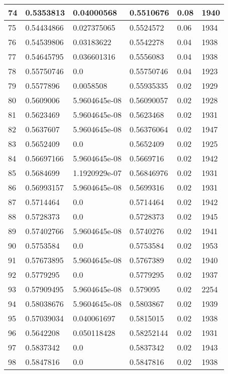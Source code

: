 \begin{longtable}{|l|l|l|l|l|l|}
74 & 0.5353813 & 0.04000568 & 0.5510676 & 0.08 & 1940 \\ \hline 
75 & 0.54434866 & 0.027375065 & 0.5524572 & 0.06 & 1934 \\ \hline 
76 & 0.54539806 & 0.03183622 & 0.5542278 & 0.04 & 1938 \\ \hline 
77 & 0.54645795 & 0.036601316 & 0.5556083 & 0.04 & 1938 \\ \hline 
78 & 0.55750746 & 0.0 & 0.55750746 & 0.04 & 1923 \\ \hline 
79 & 0.5577896 & 0.0058508 & 0.55935335 & 0.02 & 1929 \\ \hline 
80 & 0.5609006 & 5.9604645e-08 & 0.56090057 & 0.02 & 1928 \\ \hline 
81 & 0.5623469 & 5.9604645e-08 & 0.5623468 & 0.02 & 1931 \\ \hline 
82 & 0.5637607 & 5.9604645e-08 & 0.56376064 & 0.02 & 1947 \\ \hline 
83 & 0.5652409 & 0.0 & 0.5652409 & 0.02 & 1925 \\ \hline 
84 & 0.56697166 & 5.9604645e-08 & 0.5669716 & 0.02 & 1942 \\ \hline 
85 & 0.5684699 & 1.1920929e-07 & 0.56846976 & 0.02 & 1931 \\ \hline 
86 & 0.56993157 & 5.9604645e-08 & 0.5699316 & 0.02 & 1931 \\ \hline 
87 & 0.5714464 & 0.0 & 0.5714464 & 0.02 & 1942 \\ \hline 
88 & 0.5728373 & 0.0 & 0.5728373 & 0.02 & 1945 \\ \hline 
89 & 0.57402766 & 5.9604645e-08 & 0.5740276 & 0.02 & 1941 \\ \hline 
90 & 0.5753584 & 0.0 & 0.5753584 & 0.02 & 1953 \\ \hline 
91 & 0.57673895 & 5.9604645e-08 & 0.5767389 & 0.02 & 1940 \\ \hline 
92 & 0.5779295 & 0.0 & 0.5779295 & 0.02 & 1937 \\ \hline 
93 & 0.57909495 & 5.9604645e-08 & 0.579095 & 0.02 & 2254 \\ \hline 
94 & 0.58038676 & 5.9604645e-08 & 0.5803867 & 0.02 & 1939 \\ \hline 
95 & 0.57039034 & 0.040061697 & 0.5815015 & 0.02 & 1938 \\ \hline 
96 & 0.5642208 & 0.050118428 & 0.58252144 & 0.02 & 1931 \\ \hline 
97 & 0.5837342 & 0.0 & 0.5837342 & 0.02 & 1943 \\ \hline 
98 & 0.5847816 & 0.0 & 0.5847816 & 0.02 & 1938 \\ \hline 

\end{longtable}
